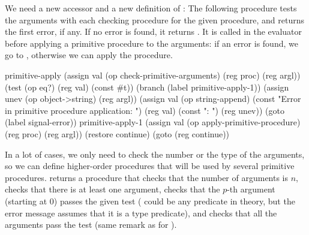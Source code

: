 \begin{exe}[5.30]
\begin{enumerate}
	    We need a new accessor and a new definition of 
	    :
	    The following procedure tests the arguments with each checking 
	    procedure for the given procedure, and returns the first error, if 
	    any. If no error is found, it returns .
	    It is called in the evaluator before applying a primitive procedure 
	    to the arguments: if an error is found, we go to 
	    , otherwise we can apply the procedure.
	    \begin{cscm}
		primitive-apply
		    (assign val (op check-primitive-arguments) (reg proc) (reg argl))
		    (test (op eq?) (reg val) (const #t))
		    (branch (label primitive-apply-1))
		    (assign unev (op object->string) (reg argl))
		    (assign val (op string-append)
			    (const "Error in primitive procedure application: ")
			    (reg val) (const "\nArguments: ") (reg unev))
		    (goto (label signal-error))
		primitive-apply-1
		    (assign val (op apply-primitive-procedure) (reg proc) (reg argl))
		    (restore continue)
		    (goto (reg continue))
	    \end{cscm}
	    In a lot of cases, we only need to check the number or the type of 
	    the arguments, so we can define higher-order procedures that will be 
	    used by several primitive procedures.  returns 
	    a procedure that checks that the number of arguments is $n$, 
	     checks that there is at least one argument, 
	     checks that the $p$-th argument (starting 
	    at 0) passes the given test ( could be any predicate in 
	    theory, but the error message assumes that it is a type predicate), 
	    and  checks that all the arguments pass the 
	    test (same remark as for ).


\end{enumerate}
\end{exe}
